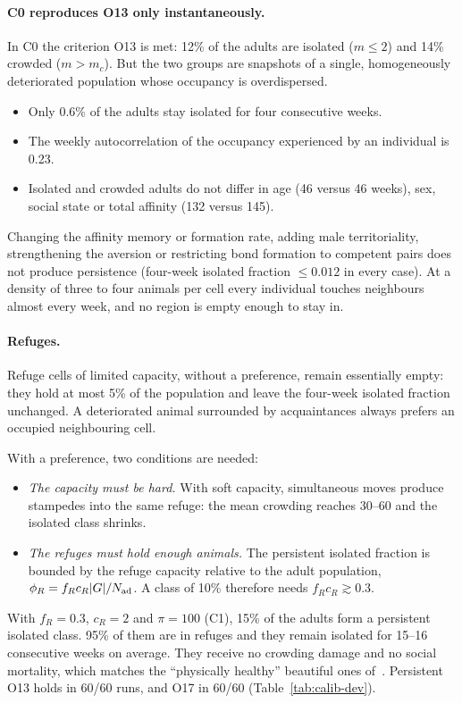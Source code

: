 \paragraph{\textsf{C0} reproduces O13 only instantaneously.}
In \textsf{C0} the criterion O13 is met: 12\% of the adults are isolated ($m\le2$) and 14\% crowded
($m>m_c$). But the two groups are snapshots of a single, homogeneously deteriorated population whose
occupancy is overdispersed.
\begin{itemize}
  \item Only 0.6\% of the adults stay isolated for four consecutive weeks.
  \item The weekly autocorrelation of the occupancy experienced by an individual is 0.23.
  \item Isolated and crowded adults do not differ in age (46 versus 46 weeks), sex, social state or total
    affinity (132 versus 145).
\end{itemize}
Changing the affinity memory or formation rate, adding male territoriality, strengthening the aversion
or restricting bond formation to competent pairs does not produce persistence (four-week isolated
fraction $\le0.012$ in every case). At a density of three to four animals per cell every individual
touches neighbours almost every week, and no region is empty enough to stay in.

\paragraph{Refuges.}
Refuge cells of limited capacity, without a preference, remain essentially empty: they hold at most 5\%
of the population and leave the four-week isolated fraction unchanged. A deteriorated animal surrounded by
acquaintances always prefers an occupied neighbouring cell.

With a preference, two conditions are needed:
\begin{itemize}
  \item \emph{The capacity must be hard.} With soft capacity, simultaneous moves produce stampedes into
    the same refuge: the mean crowding reaches 30--60 and the isolated class shrinks.
  \item \emph{The refuges must hold enough animals.} The persistent isolated fraction is bounded by the
    refuge capacity relative to the adult population, $\phi_R=f_Rc_R|G|/N_{\rm ad}$. A class of 10\%
    therefore needs $f_Rc_R\gtrsim0.3$.
\end{itemize}
With $f_R=0.3$, $c_R=2$ and $\pi=100$ (\textsf{C1}), 15\% of the adults form a persistent isolated
class. 95\% of them are in refuges and they remain isolated for 15--16 consecutive weeks on average.
They receive no crowding damage and no social mortality, which matches the ``physically healthy''
beautiful ones of~\cite{Calhoun1973}. Persistent O13 holds in 60/60 runs, and O17 in 60/60
(Table~\ref{tab:calib-dev}).

